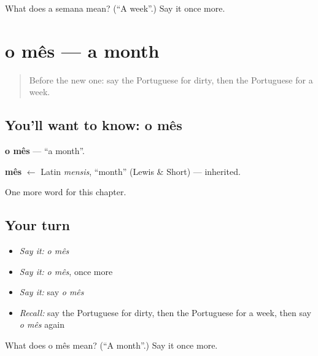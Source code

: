\begin{tcolorbox}[breakable,colback=teal!4,colframe=teal!35!black,title={Before you move on}]
What does a semana mean? (\textquotedblleft{}A week\textquotedblright{}.) Say it once more.
\end{tcolorbox}
\section[o mês]{o mês — a month}

\label{lesson:PT-C70-mes}



\begin{quote}
Before the new one: say the Portuguese for dirty, then the Portuguese for a week.
\end{quote}

\subsection*{You'll want to know: o mês}
\textbf{o mês} — \textquotedblleft{}a month\textquotedblright{}.

\begin{cousinweb}
\textbf{mês} $\leftarrow$ Latin \emph{mensis}, \textquotedblleft{}month\textquotedblright{} (Lewis \& Short) — inherited.
\end{cousinweb}

\begin{grammarlens}[title={What you've built}]
One more word for this chapter.
\end{grammarlens}

\subsection*{Your turn}
\begin{itemize}
\raggedright
  \item \emph{Say it:} \emph{o mês}
  \item \emph{Say it:} \emph{o mês}, once more
  \item \emph{Say it:} say \emph{o mês}
  \item \emph{Recall:} say the Portuguese for dirty, then the Portuguese for a week, then say \emph{o mês} again
\end{itemize}

\begin{tcolorbox}[breakable,colback=teal!4,colframe=teal!35!black,title={Before you move on}]
What does o mês mean? (\textquotedblleft{}A month\textquotedblright{}.) Say it once more.
\end{tcolorbox}
